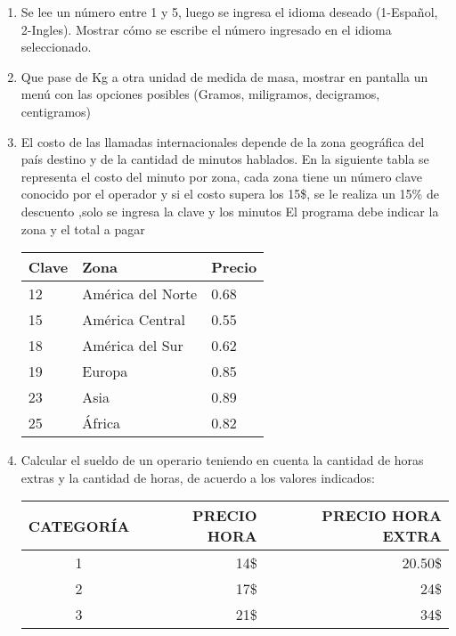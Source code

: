 \begin{enumerate}[resume]

	\item Se lee un número entre 1 y 5, luego se ingresa el idioma deseado (1-Español, 2-Ingles). Mostrar cómo se escribe el número ingresado en el idioma seleccionado.

    \item Que pase de Kg a otra unidad de medida de masa, mostrar en pantalla un menú con las opciones posibles (Gramos, miligramos, decigramos, centigramos)

	\item El costo de las llamadas internacionales depende de la zona geográfica del país destino y de la cantidad de minutos hablados. En la siguiente tabla se representa el costo del  minuto por zona, cada zona tiene un número clave conocido por el operador y si el costo supera los 15\$, se le realiza un 15\% de descuento ,solo se ingresa la clave y los minutos El programa debe indicar la zona y el total a pagar

    \begin{table}[H]
     \begin{center}
      \begin{tabular}{l|l|l}
		Clave &           Zona & Precio \\
		\toprule
		12 & América del Norte &  0.68 \\
		15 & América Central   &  0.55 \\
		18 & América del Sur   &  0.62 \\
		19 & Europa            &  0.85 \\
		23 & Asia              &  0.89 \\
		25 & África            &  0.82 \\     
      \end{tabular}
     \end{center}
    \end{table}

	\item Calcular el sueldo de un operario teniendo en cuenta la cantidad de horas extras y la cantidad de horas, de acuerdo a los valores indicados:
    \begin{table}[H]
     \begin{center}
      \begin{tabular}{c|r|r}	 
	 
		CATEGORÍA       &        PRECIO HORA      &         PRECIO  HORA EXTRA \\
		\toprule
		1 & 14\$ & 20.50\$ \\
		2 & 17\$ & 24\$ \\
		3 & 21\$ & 34\$ \\
	 \end{tabular}
   \end{center}
  \end{table}


\end{enumerate}
